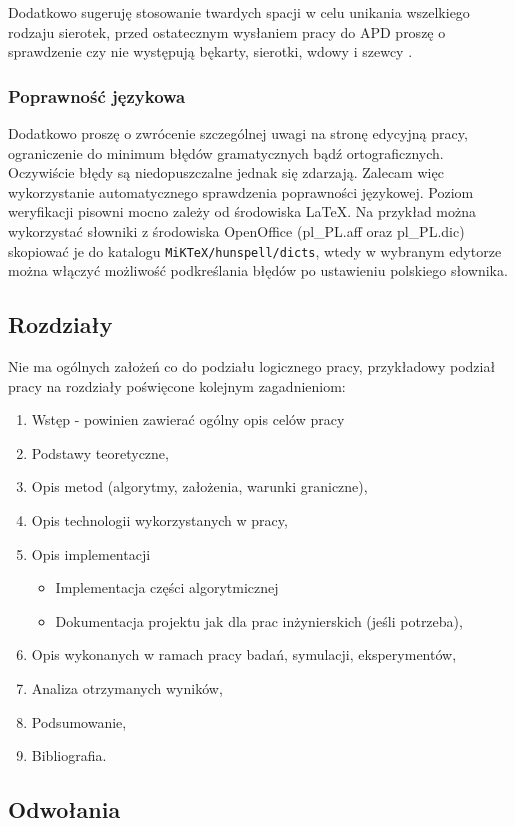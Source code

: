 \documentclass[12pt,a4paper]{article}
\begin{document}
Dodatkowo sugeruję stosowanie twardych spacji w celu unikania wszelkiego rodzaju sierotek, przed ostatecznym wysłaniem pracy do APD proszę o sprawdzenie czy nie występują  bękarty, sierotki, wdowy i szewcy \cite{Bekart}.

\subsubsection*{Poprawność językowa}
Dodatkowo proszę o zwrócenie szczególnej uwagi na stronę edycyjną pracy, ograniczenie do minimum błędów gramatycznych bądź ortograficznych. Oczywiście błędy są niedopuszczalne jednak się zdarzają. Zalecam więc wykorzystanie automatycznego sprawdzenia poprawności językowej. Poziom weryfikacji pisowni mocno zależy od środowiska \LaTeX. Na przykład można wykorzystać słowniki z środowiska OpenOffice (pl\_PL.aff oraz pl\_PL.dic) skopiować je  do katalogu {\tt MiKTeX/hunspell/dicts}, wtedy w wybranym edytorze można włączyć możliwość podkreślania błędów po ustawieniu polskiego słownika.

\subsection{Rozdziały}
Nie ma ogólnych założeń co do podziału logicznego pracy, przykładowy podział pracy na rozdziały poświęcone kolejnym zagadnieniom:
\begin{enumerate}
\item Wstęp - powinien zawierać ogólny opis celów pracy
\item Podstawy teoretyczne,
\item Opis metod (algorytmy, założenia, warunki graniczne),
\item Opis technologii wykorzystanych w pracy,
\item Opis implementacji
\begin{itemize}
\item Implementacja części algorytmicznej
\item Dokumentacja projektu jak dla prac inżynierskich (jeśli potrzeba),
\end{itemize}
\item Opis wykonanych w ramach pracy badań, symulacji, eksperymentów,
\item Analiza otrzymanych wyników,
\item Podsumowanie,
\item Bibliografia.
\end{enumerate}

\subsection{Odwołania}
\end{document}
